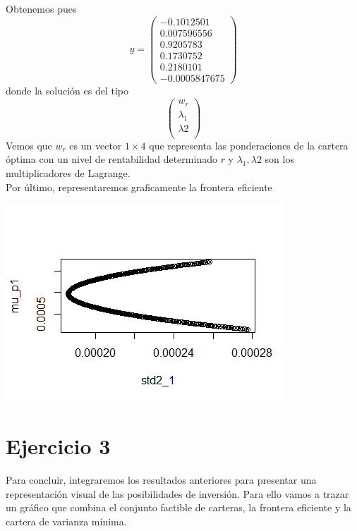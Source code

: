 \documentclass[a4paper,]{article}
\begin{document}

Obtenemos pues
\begin{equation*}
    y=
\begin{pmatrix}
-0.1012501\\
0.007596556\\
0.9205783\\
0.1730752 \\
0.2180101 \\
-0.0005847675
\end{pmatrix}
\end{equation*}
donde la solución es del tipo $$
\begin{pmatrix}
w_{r}\\
\lambda_{1}\\
\lambda{2}\\
\end{pmatrix}$$
Vemos que $w_{r}$ es un vector $1\times4$ que representa las ponderaciones de la cartera óptima con un nivel de rentabilidad determinado $r$
y $\lambda_{1}, \lambda{2}$ son los multiplicadores de Lagrange. \\

Por último, representaremos graficamente la frontera eficiente
\begin{center}
        \includegraphics[scale=1]{Rplot11.png}
\end{center}

\section*{Ejercicio 3}
Para concluir, integraremos los resultados anteriores para presentar una representación visual de las posibilidades de inversión. Para ello vamos a trazar un gráfico que combina el conjunto factible de carteras, la frontera eficiente y la cartera de varianza mínima. \\
\end{document}
